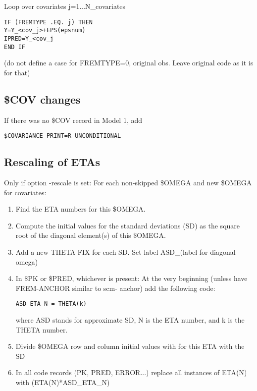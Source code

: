 Loop over covariates j=1...N\_covariates %
\begin{verbatim}
IF (FREMTYPE .EQ. j) THEN
Y=Y_<cov_j>+EPS(epsnum)
IPRED=Y_<cov_j
END IF
\end{verbatim}


(do not define a case for FREMTYPE=0, original obs. Leave original code as it is for that)

\subsection{\$COV changes}
If there was no \$COV record in Model 1, add
\begin{verbatim}
$COVARIANCE PRINT=R UNCONDITIONAL
\end{verbatim}

\subsection{Rescaling of ETAs}
Only if option -rescale is set:
For each non-skipped \$OMEGA and new \$OMEGA for covariates:
\begin{enumerate}
\item Find the ETA numbers for this \$OMEGA.
\item Compute the initial values for the standard deviations (SD) as the square root of the diagonal
element(s) of this \$OMEGA.
\item Add a new THETA FIX for each SD. Set label ASD\_(label for diagonal omega)
\item In \$PK or \$PRED, whichever is present:
At the very beginning (unless have FREM-ANCHOR similar to scm- anchor) add the following code: \\
\begin{verbatim}
ASD_ETA_N = THETA(k)
\end{verbatim}
where ASD stands for approximate SD, N is the ETA number, and k is the THETA number.
\item Divide \$OMEGA row and column initial values with for this ETA with the SD
\item In all code records (PK, PRED, ERROR...) replace all instances of ETA(N) with (ETA(N)*ASD\_ETA\_N)
\end{enumerate}

